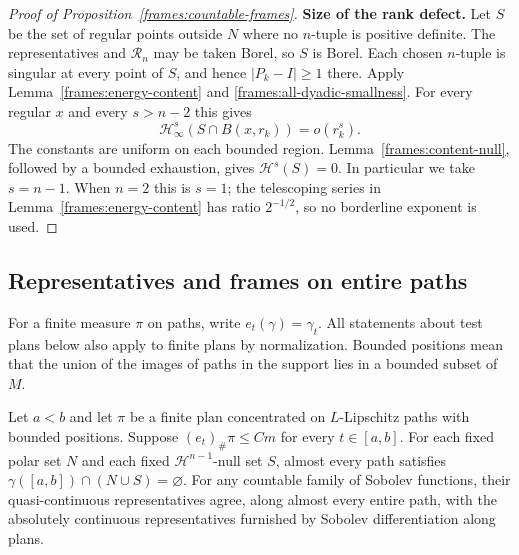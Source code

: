 \begin{proof}[Proof of Proposition~\ref{frames:countable-frames}]
 \textbf{Size of the rank defect.}
 Let $S$ be the set of regular points outside $N$ where no $n$-tuple
 is positive definite.  The representatives and $\mathcal R_n$ may
 be taken Borel, so $S$ is Borel.  Each chosen $n$-tuple is singular
 at every point of $S$, and hence $|P_k-I|\geq1$ there.
 Apply Lemma~\ref{frames:energy-content} and
 \eqref{frames:all-dyadic-smallness}.  For every regular $x$ and
 every $s>n-2$ this gives
 \[
  \mathcal H^s_\infty(S\cap B(x,r_k))=o(r_k^s).
 \]
 The constants are uniform on each bounded region.
 Lemma~\ref{frames:content-null}, followed by a bounded exhaustion, gives
 $\mathcal H^s(S)=0$.  In particular we take $s=n-1$.
 When $n=2$ this is $s=1$; the telescoping series in
 Lemma~\ref{frames:energy-content} has ratio $2^{-1/2}$, so no
 borderline exponent is used.
\end{proof}

\subsection{Representatives and frames on entire paths}
\label{frames:sub-paths}

For a finite measure $\pi$ on paths, write $e_t(\gamma)=\gamma_t$.
All statements about test plans below also apply to finite plans by
normalization.  Bounded positions mean that the union of the images
of paths in the support lies in a bounded subset of $M$.

\begin{lemma}
 \label{frames:path-avoidance}
 Let $a<b$ and let $\pi$ be a finite plan concentrated on
 $L$-Lipschitz paths with bounded positions.  Suppose
 $(e_t)_\#\pi\leq C m$ for every $t\in[a,b]$.
 For each fixed polar set $N$ and each fixed $\mathcal H^{n-1}$-null
 set $S$, almost every path satisfies
 $\gamma([a,b])\cap(N\cup S)=\varnothing$.
 For any countable family of
 Sobolev functions, their quasi-continuous representatives agree,
 along almost every entire path, with the absolutely continuous
 representatives furnished by Sobolev differentiation along plans.
\end{lemma}

